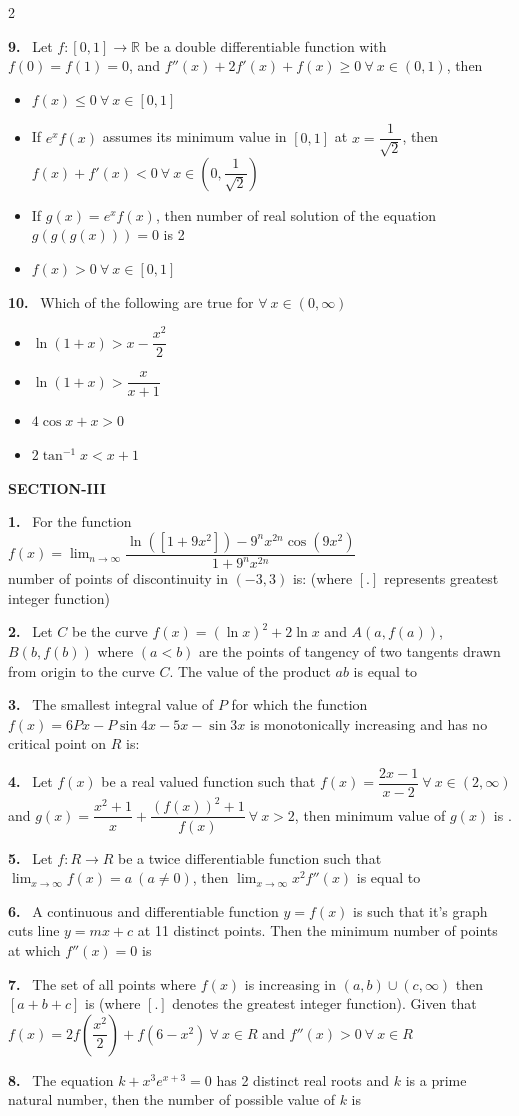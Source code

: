 \documentclass[10pt]{extarticle}
\newcommand{\sect}[1]{\par\smallskip\noindent\textbf{#1}\par}
\newcommand{\qn}[1]{\par\smallskip\noindent\textbf{#1.}~}
\newenvironment{qoptions}{\begin{itemize}[leftmargin=1.8em,itemsep=1pt,topsep=2pt,label={}]}{\end{itemize}}
\newcommand{\opt}[2]{\item[(#1)] #2}
\begin{document}
\begin{multicols}{2}
\qn{9} Let $f:[0,1]\to\mathbb R$ be a double differentiable function with $f(0)=f(1)=0$, and $f''(x)+2f'(x)+f(x)\ge0\ \forall\ x\in(0,1)$, then
\begin{qoptions}
\opt{A}{$f(x)\le0\ \forall\ x\in[0,1]$}
\opt{B}{If $e^xf(x)$ assumes its minimum value in $[0,1]$ at $x=\dfrac{1}{\sqrt2}$, then $f(x)+f'(x)<0\ \forall\ x\in\left(0,\dfrac{1}{\sqrt2}\right)$}
\opt{C}{If $g(x)=e^xf(x)$, then number of real solution of the equation $g(g(g(x)))=0$ is 2}
\opt{D}{$f(x)>0\ \forall\ x\in[0,1]$}
\end{qoptions}

\qn{10} Which of the following are true for $\forall\ x\in(0,\infty)$
\begin{qoptions}
\opt{A}{$\ln(1+x)>x-\dfrac{x^2}{2}$}
\opt{B}{$\ln(1+x)>\dfrac{x}{x+1}$}
\opt{C}{$4\cos x+x>0$}
\opt{D}{$2\tan^{-1}x<x+1$}
\end{qoptions}

\sect{SECTION-III}
\qn{1} For the function\\$f(x)=\displaystyle\lim_{n\to\infty}\dfrac{\ln([1+9x^2])-9^nx^{2n}\cos(9x^2)}{1+9^nx^{2n}}$\\number of points of discontinuity in $(-3,3)$ is: (where $[.]$ represents greatest integer function)

\qn{2} Let $C$ be the curve $f(x)=(\ln x)^2+2\ln x$ and $A(a,f(a))$, $B(b,f(b))$ where $(a<b)$ are the points of tangency of two tangents drawn from origin to the curve $C$. The value of the product $ab$ is equal to

\qn{3} The smallest integral value of $P$ for which the function $f(x)=6Px-P\sin4x-5x-\sin3x$ is monotonically increasing and has no critical point on $R$ is:

\qn{4} Let $f(x)$ be a real valued function such that $f(x)=\dfrac{2x-1}{x-2}\ \forall\ x\in(2,\infty)$ and $g(x)=\dfrac{x^2+1}{x}+\dfrac{(f(x))^2+1}{f(x)}\ \forall\ x>2$, then minimum value of $g(x)$ is \underline{\hspace{2.5em}}.

\qn{5} Let $f:R\to R$ be a twice differentiable function such that $\displaystyle\lim_{x\to\infty}f(x)=a\ (a\ne0)$, then $\displaystyle\lim_{x\to\infty}x^2f''(x)$ is equal to

\qn{6} A continuous and differentiable function $y=f(x)$ is such that it's graph cuts line $y=mx+c$ at 11 distinct points. Then the minimum number of points at which $f''(x)=0$ is

\qn{7} The set of all points where $f(x)$ is increasing in $(a,b)\cup(c,\infty)$ then $[a+b+c]$ is (where $[.]$ denotes the greatest integer function). Given that $f(x)=2f\left(\dfrac{x^2}{2}\right)+f(6-x^2)\ \forall\ x\in R$ and $f''(x)>0\ \forall\ x\in R$

\qn{8} The equation $k+x^3e^{x+3}=0$ has 2 distinct real roots and $k$ is a prime natural number, then the number of possible value of $k$ is
\end{multicols}
\end{document}
